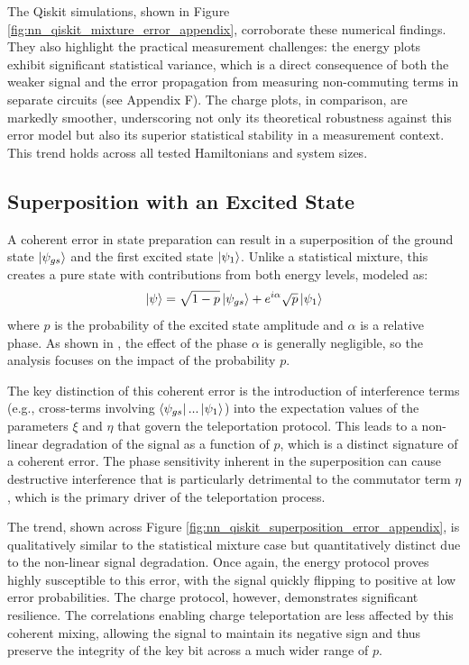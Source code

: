 The Qiskit simulations, shown in Figure \ref{fig:nn_qiskit_mixture_error_appendix}, corroborate these numerical findings. They also highlight the practical measurement challenges: the energy plots exhibit significant statistical variance, which is a direct consequence of both the weaker signal and the error propagation from measuring non-commuting terms in separate circuits (see Appendix F). The charge plots, in comparison, are markedly smoother, underscoring not only its theoretical robustness against this error model but also its superior statistical stability in a measurement context. This trend holds across all tested Hamiltonians and system sizes.

\subsection{Superposition with an Excited State}



A coherent error in state preparation can result in a superposition of the ground state $\ket{\psi_{gs}}$ and the first excited state $\ket{\psi_{1}}$. Unlike a statistical mixture, this creates a pure state with contributions from both energy levels, modeled as:
\begin{equation*}
\ket{\psi} = \sqrt{1-p}\ket{\psi_{gs}} + e^{i\alpha}\sqrt{p}\ket{\psi_{1}}
\end{equation*}
where $p$ is the probability of the excited state amplitude and $\alpha$ is a relative phase. As shown in \cite{QKDbyQET}, the effect of the phase $\alpha$ is generally negligible, so the analysis focuses on the impact of the probability $p$.

The key distinction of this coherent error is the introduction of interference terms (e.g., cross-terms involving $\bra{\psi_{gs}}...\ket{\psi_{1}}$) into the expectation values of the parameters $\xi$ and $\eta$ that govern the teleportation protocol. This leads to a non-linear degradation of the signal as a function of $p$, which is a distinct signature of a coherent error. The phase sensitivity inherent in the superposition can cause destructive interference that is particularly detrimental to the commutator term $\eta$, which is the primary driver of the teleportation process.

The trend, shown across Figure \ref{fig:nn_qiskit_superposition_error_appendix}, is qualitatively similar to the statistical mixture case but quantitatively distinct due to the non-linear signal degradation. Once again, the energy protocol proves highly susceptible to this error, with the signal quickly flipping to positive at low error probabilities. The charge protocol, however, demonstrates significant resilience. The correlations enabling charge teleportation are less affected by this coherent mixing, allowing the signal to maintain its negative sign and thus preserve the integrity of the key bit across a much wider range of $p$.

